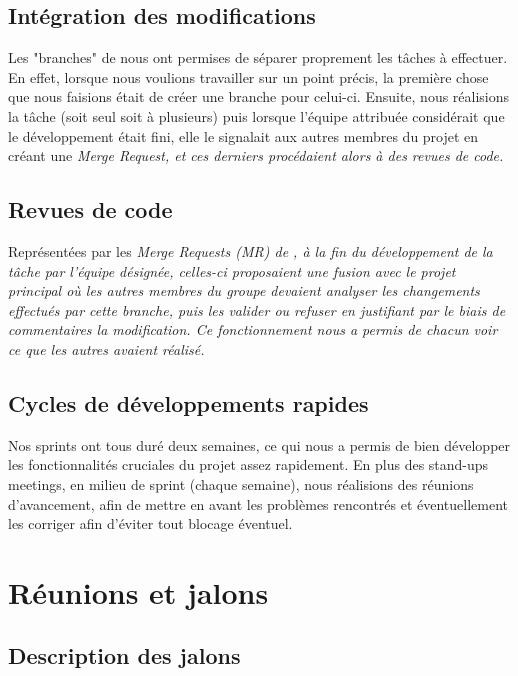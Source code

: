\documentclass[a4paper, 12pt]{report}
\newcommand{\tech}[1]{\sf{#1}}
\newcommand{\gl}{\tech{GitLab}}
\newcommand{\en}[1]{\it{#1}}
\begin{document}
    \section{Intégration des modifications}
    
    Les "branches" de \gl{} nous ont permises de séparer proprement les tâches à effectuer. En effet, lorsque nous voulions travailler sur un point précis, la première chose que nous faisions était de créer une branche pour celui-ci. Ensuite, nous réalisions la tâche (soit seul soit à plusieurs) puis lorsque l'équipe attribuée considérait que le développement était fini, elle le signalait aux autres membres du projet en créant une \en{Merge Request}, et ces derniers procédaient alors à des revues de code.
    
    \section{Revues de code}
    
    Représentées par les \en{Merge Requests} (MR) de \gl{}, à la fin du développement de la tâche par l'équipe désignée, celles-ci proposaient une fusion avec le projet principal où les autres membres du groupe devaient analyser les changements effectués par cette branche, puis les valider ou refuser en justifiant par le biais de commentaires la modification. Ce fonctionnement nous a permis de chacun voir ce que les autres avaient réalisé.
    
    \section{Cycles de développements rapides}
    
    Nos sprints ont tous duré deux semaines, ce qui nous a permis de bien développer les fonctionnalités cruciales du projet assez rapidement. En plus des stand-ups meetings, en milieu de sprint (chaque semaine), nous réalisions des réunions d'avancement, afin de mettre en avant les problèmes rencontrés et éventuellement les corriger afin d'éviter tout blocage éventuel.
    
    \chapter{Réunions et jalons}
    
    \section{Description des jalons}
    
\end{document}
